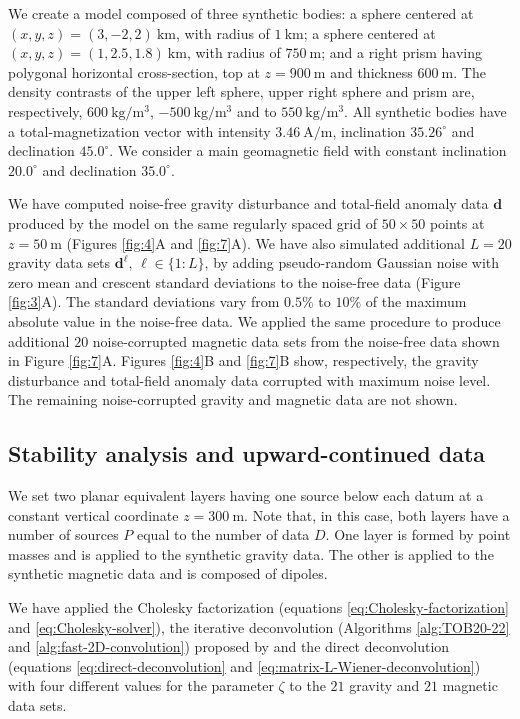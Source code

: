 We create a model composed of three synthetic bodies:
a sphere centered at $(x, y, z) = (3, -2, 2) \: \mathrm{km}$, with radius of $1 \: \mathrm{km}$;
a sphere centered at $(x, y, z) = (1, 2.5, 1.8) \: \mathrm{km}$, with radius of $750 \: \mathrm{m}$; and
a right prism having polygonal horizontal cross-section, top at $z = 900 \: \mathrm{m}$ and thickness $600 \: \mathrm{m}$.
The density contrasts of the upper left sphere, upper right sphere and prism are, respectively, 
$600 \: \mathrm{kg}/\mathrm{m}^{3}$, $-500 \: \mathrm{kg}/\mathrm{m}^{3}$ and to $550 \: \mathrm{kg}/\mathrm{m}^{3}$. 
All synthetic bodies have a total-magnetization vector with intensity $3.46 \: \mathrm{A}/\mathrm{m}$, inclination $35.26^{\circ}$
and declination $45.0^{\circ}$.
We consider a main geomagnetic field with constant inclination $20.0^{\circ}$ and declination $35.0^{\circ}$.

We have computed noise-free gravity disturbance and total-field anomaly data $\mathbf{d}$ produced by the
model on the same regularly spaced grid of $50 \times 50$ points at $z = 50 \: \mathrm{m}$
(Figures \ref{fig:4}A and \ref{fig:7}A).
We have also simulated additional $L = 20$ gravity data sets $\mathbf{d}^{\ell}$, $\ell \in \{1:L\}$, 
by adding pseudo-random Gaussian noise 
with zero mean and crescent standard deviations to the noise-free data (Figure \ref{fig:3}A).
The standard deviations vary from $0.5\%$ to $10\%$ of the maximum absolute value in the noise-free data.
We applied the same procedure to produce additional $20$ noise-corrupted magnetic data sets from the
noise-free data shown in Figure \ref{fig:7}A.
Figures \ref{fig:4}B and \ref{fig:7}B show, respectively, the gravity disturbance and total-field anomaly data 
corrupted with maximum noise level.
The remaining noise-corrupted gravity and magnetic data are not shown.

\subsection{Stability analysis and upward-continued data}

We set two planar equivalent layers having one source below each datum at a constant vertical coordinate $z = 300 \: \mathrm{m}$.
Note that, in this case, both layers have a number of sources $P$ equal to the number of data $D$.
One layer is formed by point masses and is applied to the synthetic gravity data.
The other is applied to the synthetic magnetic data and is composed of dipoles.

We have applied the Cholesky factorization (equations \ref{eq:Cholesky-factorization} and \ref{eq:Cholesky-solver}), 
the iterative deconvolution (Algorithms \ref{alg:TOB20-22} and \ref{alg:fast-2D-convolution}) proposed by 
\citet{takahashi-etal2020, takahashi-etal2022} and the direct deconvolution (equations \ref{eq:direct-deconvolution} and \ref{eq:matrix-L-Wiener-deconvolution})
with four different values for the parameter $\zeta$ to the $21$ gravity and $21$ magnetic data sets.

